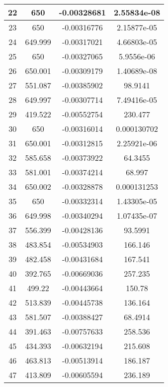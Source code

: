 \begin{table}[h]
{\begin{tabular}{|c|c|c|c|}
22   &   650   &   -0.00328681   &   2.55834e-08  \\  \hline  
23   &   650   &   -0.00316776   &   2.15877e-05  \\  \hline  
24   &   649.999   &   -0.00317021   &   4.66803e-05  \\  \hline  
25   &   650   &   -0.00327065   &   5.9556e-06  \\  \hline  
26   &   650.001   &   -0.00309179   &   1.40689e-08  \\  \hline  
27   &   551.087   &   -0.00385902   &   98.9141  \\  \hline  
28   &   649.997   &   -0.00307714   &   7.49416e-05  \\  \hline  
29   &   419.522   &   -0.00552754   &   230.477  \\  \hline  
30   &   650   &   -0.00316014   &   0.000130702  \\  \hline  
31   &   650.001   &   -0.00312815   &   2.25921e-06  \\  \hline  
32   &   585.658   &   -0.00373922   &   64.3455  \\  \hline  
33   &   581.001   &   -0.00374214   &   68.997  \\  \hline  
34   &   650.002   &   -0.00328878   &   0.000131253  \\  \hline  
35   &   650   &   -0.00332314   &   1.43305e-05  \\  \hline  
36   &   649.998   &   -0.00340294   &   1.07435e-07  \\  \hline  
37   &   556.399   &   -0.00428136   &   93.5991  \\  \hline  
38   &   483.854   &   -0.00534903   &   166.146  \\  \hline  
39   &   482.458   &   -0.00431684   &   167.541  \\  \hline  
40   &   392.765   &   -0.00669036   &   257.235  \\  \hline  
41   &   499.22   &   -0.00443664   &   150.78  \\  \hline  
42   &   513.839   &   -0.00445738   &   136.164  \\  \hline  
43   &   581.507   &   -0.00388427   &   68.4914  \\  \hline  
44   &   391.463   &   -0.00757633   &   258.536  \\  \hline  
45   &   434.393   &   -0.00632194   &   215.608  \\  \hline  
46   &   463.813   &   -0.00513914   &   186.187  \\  \hline  
47   &   413.809   &   -0.00605594   &   236.189  \\  \hline  

\end{tabular}}
\end{table}
